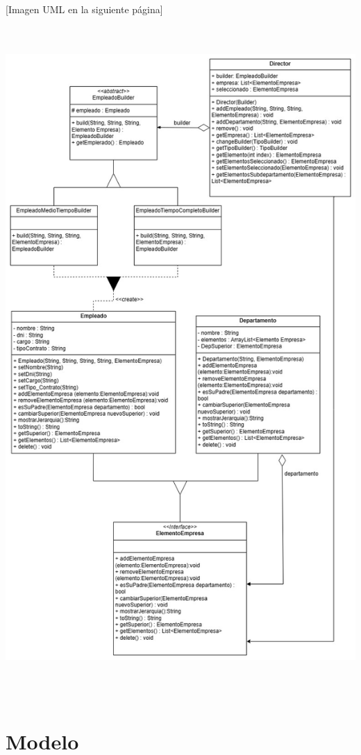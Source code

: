 \documentclass[
]{article}
\begin{document}
{[}Imagen UML en la siguiente página{]}
\includegraphics[width=5.90522in,height=10.22222in]{imagenes/UML.jpg}
\restoregeometry
\section{Modelo}\label{modelo}
\end{document}
